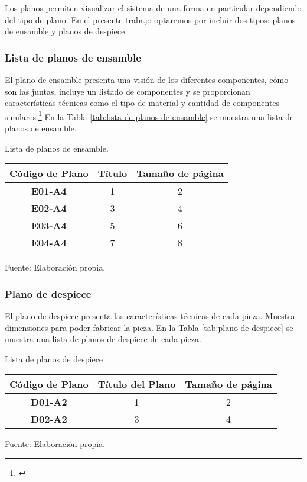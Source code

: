 Los planos permiten visualizar el sistema de una forma en particular dependiendo del tipo de plano. En el presente trabajo optaremos por incluir dos tipos: planos de ensamble y planos de despiece.

\subsubsection{Lista de planos de ensamble}

El plano de ensamble presenta una visión de los diferentes componentes, cómo son las juntas, incluye un listado de componentes y se proporcionan características técnicas como el  tipo de material y cantidad de componentes similares.\footnote{\cite{Goetsch2010}} En la Tabla \ref{tab:lista de planos de ensamble} se muestra una lista de planos de ensamble.


\begin{mytable}[H]
	\footnotesize\centering
	\caption{Lista de planos de ensamble.}
	\label{tab:lista de planos de ensamble}
	\begin{tabular}{|c|c|c|}
		\hline
		\textbf{Código de Plano} & \textbf{Título} & \textbf{Tamaño de página} \\ \hline
		\textbf{E01-A4}        & 1              & 2             \\ \hline
		\textbf{E02-A4}        & 3              & 4             \\ \hline
		\textbf{E03-A4}        & 5              & 6             \\ \hline
		\textbf{E04-A4}        & 7              & 8             \\ \hline
	\end{tabular}
	\begin{myflushcenteraftertable}	
	Fuente: Elaboración propia.
	\end{myflushcenteraftertable}
\end{mytable}


\subsubsection{Plano de despiece}

El plano de despiece presenta las características técnicas de cada pieza. Muestra dimensiones para poder fabricar la pieza. En la Tabla \ref{tab:plano de despiece} se muestra una lista de planos de despiece de cada pieza.

\begin{mytable}[H]
	\footnotesize\centering
	\caption{Lista de planos de despiece}
	\label{tab:plano de despiece}
	\begin{tabular}{|c|c|c|}
		\hline
		\textbf{Código de Plano} & \textbf{Título del Plano} & \textbf{Tamaño de página} \\ \hline
		\textbf{D01-A2}  & 1 & 2 \\ \hline
		\textbf{D02-A2}  & 3 & 4 \\ \hline
	\end{tabular}
	\begin{myflushcenteraftertable}	
	Fuente: Elaboración propia.
	\end{myflushcenteraftertable}
\end{mytable}
